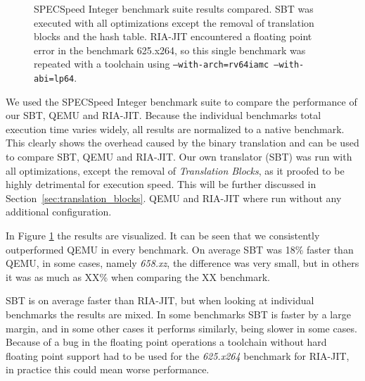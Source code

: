 \documentclass[course=eragp]{aspdoc}
\begin{document}
\begin{figure}
\begin{centering}
        \caption{
            SPECSpeed Integer benchmark suite results compared.
            SBT was executed with all optimizations except the removal of translation blocks and the hash table.
            RIA-JIT encountered a floating point error in the benchmark 625.x264, so this
            single benchmark was repeated with a toolchain using \texttt{--with-arch=rv64iamc --with-abi=lp64}.
        }\label{benchmark_results1}
    \end{centering}
\end{figure}

We used the SPECSpeed Integer benchmark suite to compare
the performance of our SBT, QEMU and RIA-JIT. Because the individual benchmarks
total execution time varies widely, all results are normalized to a native
benchmark. This clearly shows the overhead caused by the binary translation
and can be used to compare SBT, QEMU and RIA-JIT.
Our own translator (SBT) was run with all optimizations, except the removal of
\emph{Translation Blocks}, as it proofed to be highly detrimental for execution speed.
This will be further discussed in Section~\ref{sec:translation_blocks}. %
QEMU and RIA-JIT where run without any additional configuration.

\par

In Figure \ref{benchmark_results1} the results are visualized.
It can be seen that we consistently outperformed QEMU in every benchmark.
On average SBT was 18\% faster than QEMU, in some cases, namely \emph{658.xz}, the difference was
very small, but in others it was as much as XX\% when comparing the XX benchmark.

\par

SBT is on average faster than RIA-JIT, but when looking at individual benchmarks the results are mixed.
In some benchmarks SBT is faster by a large margin, and in some other cases it performs similarly, being slower in some cases.
Because of a bug in the floating point operations a toolchain without hard floating point support had to be used for the \emph{625.x264} benchmark for RIA-JIT,
in practice this could mean worse performance.
\end{document}
